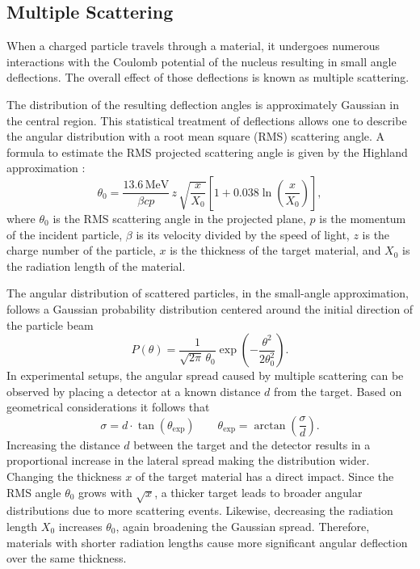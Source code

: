 \documentclass[sn-mathphys-num,iicol]{sn-jnl}
\theoremstyle{thmstyleone}
\theoremstyle{thmstyletwo}
\theoremstyle{thmstylethree}
\begin{document}
\subsection{Multiple Scattering}\label{subsec:theory_scattering}
When a charged particle travels through a material, it undergoes numerous interactions with the Coulomb potential of the nucleus resulting in small angle deflections.
The overall effect of those deflections is known as multiple scattering. 

The distribution of the resulting deflection angles is approximately Gaussian in the central region. 
This statistical treatment of deflections allows one to describe the angular distribution with a root mean square (RMS) scattering angle.
A formula to estimate the RMS projected scattering angle is given by the Highland approximation \cite{Highland}:
\begin{equation}\label{eq:Highland}
    \theta_0 = \frac{13.6\,\text{MeV}}{\beta cp} \, z \, \sqrt{\frac{x}{X_0}} \left[1 + 0.038 \ln\left(\frac{x}{X_0}\right)\right],
\end{equation}
where $\theta_0$ is the RMS scattering angle in the projected plane, $p$ is the momentum of the incident particle, $\beta$ is its velocity divided by the speed of light, $z$ is the charge number of the particle, $x$ is the thickness of the target material, and $X_0$ is the radiation length of the material.

The angular distribution of scattered particles, in the small-angle approximation, follows a Gaussian probability distribution centered around the initial direction of the particle beam \cite{Highland2}
\begin{equation}\label{eq:Gauss}
P(\theta) = \frac{1}{\sqrt{2\pi} \, \theta_0} \exp\left( -\frac{\theta^2}{2\theta_0^2} \right).
\end{equation}
In experimental setups, the angular spread caused by multiple scattering can be observed by placing a detector at a known distance $d$ from the target. 
Based on geometrical considerations it follows that \cite{Higland2}
\begin{equation}\label{eq:theta_exp}
\sigma = d \cdot \tan\left(\theta_{\text{exp}}\right)\qquad
\theta_{\text{exp}} = \arctan\left( \frac{\sigma}{d} \right).
\end{equation}
Increasing the distance $d$ between the target and the detector results in a proportional increase in the lateral spread making the distribution wider.
Changing the thickness $x$ of the target material has a direct impact. 
Since the RMS angle $\theta_0$ grows with $\sqrt{x}$, a thicker target leads to broader angular distributions due to more scattering events. 
Likewise, decreasing the radiation length $X_0$ increases $\theta_0$, again broadening the Gaussian spread. 
Therefore, materials with shorter radiation lengths cause more significant angular deflection over the same thickness.
\end{document}
